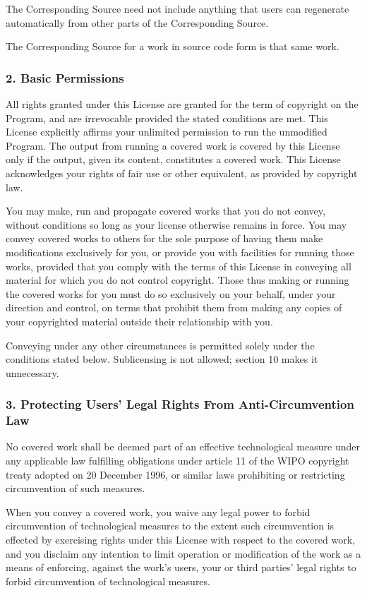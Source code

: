 \documentclass[a4paper, 11pt, twoside]{article}
\begin{document}
The Corresponding Source need not include anything that users can regenerate automatically from other parts of the Corresponding Source.

The Corresponding Source for a work in source code form is that same work.

\subsubsection{2. Basic Permissions}

All rights granted under this License are granted for the term of copyright on the Program, and are irrevocable provided the stated conditions are met. This License explicitly affirms your unlimited permission to run the unmodified Program. The output from running a covered work is covered by this License only if the output, given its content, constitutes a covered work. This License acknowledges your rights of fair use or other equivalent, as provided by copyright law.

You may make, run and propagate covered works that you do not convey, without conditions so long as your license otherwise remains in force. You may convey covered works to others for the sole purpose of having them make modifications exclusively for you, or provide you with facilities for running those works, provided that you comply with the terms of this License in conveying all material for which you do not control copyright. Those thus making or running the covered works for you must do so exclusively on your behalf, under your direction and control, on terms that prohibit them from making any copies of your copyrighted material outside their relationship with you.

Conveying under any other circumstances is permitted solely under the conditions stated below. Sublicensing is not allowed; section 10 makes it unnecessary.

\subsubsection{3. Protecting Users' Legal Rights From Anti-Circumvention Law}

No covered work shall be deemed part of an effective technological measure under any applicable law fulfilling obligations under article 11 of the WIPO copyright treaty adopted on 20 December 1996, or similar laws prohibiting or restricting circumvention of such measures.

When you convey a covered work, you waive any legal power to forbid circumvention of technological measures to the extent such circumvention is effected by exercising rights under this License with respect to the covered work, and you disclaim any intention to limit operation or modification of the work as a means of enforcing, against the work's users, your or third parties' legal rights to forbid circumvention of technological measures.
\end{document}
